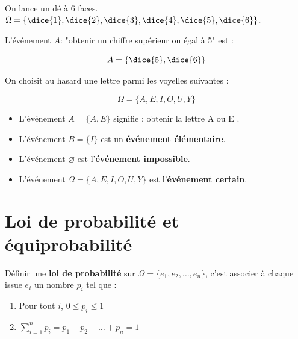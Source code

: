 On lance un dé à 6 faces. $\Omega = \{\dice{1},\dice{2},\dice{3},\dice{4},\dice{5},\dice{6}\}$.

L'événement $A$: "obtenir un chiffre supérieur ou égal à 5" est :

$$A = \{\dice{5}, \dice{6}\}$$

\ex

On choisit au hasard une lettre parmi les voyelles suivantes :

$$\Omega = \{A,E,I,O,U,Y\}$$

\begin{itemize}
	\item L'événement $A = \{A,E\}$ signifie : \og obtenir la lettre A ou E \fg.
	\item L'événement $B = \{I\}$ est un \textbf{événement élémentaire}.
	\item L'événement $\varnothing$ est l'\textbf{événement impossible}.
	\item L'événement $\Omega = \{A,E,I,O,U,Y\}$ est l'\textbf{événement certain}.
\end{itemize}

\section{Loi de probabilité et équiprobabilité}


Définir une \textbf{loi de probabilité} sur $\Omega = \{e_1, e_2, \dots, e_n\}$, c'est associer à chaque issue $e_i$ un nombre $p_i$ tel que :

\begin{enumerate}
	\item Pour tout $i$, $0 \le p_i \le 1$
	\item $\sum\limits_{i=1}^{n} p_i = p_1 + p_2 + \dots + p_n = 1$
\end{enumerate}

\ex

\def\urne{\null\\ \begin{tikzpicture}
		\draw[thick] (-2,1) arc (180:360:2 and 0.8);
		\draw[thick] (-2,1) -- (-1.6,4);
		\draw[thick] (2,1) -- (1.6,4);
		\fill[rougeClair] (0,3.2) circle (0.41);
		\node at (0,3.2) {\small\textbf{R}};
		\fill[ciel] (-0.8,2.3) circle (0.41);
		\node[text=black] at (-0.8,2.3) {\small\textbf{B}};
		\fill[ciel] (0.9,2.1) circle (0.41);
		\node[text=black] at (0.9,2.1) {\small\textbf{B}};
		\fill[menthe] (-1.0,1.1) circle (0.41);
		\node[text=black] at (-1.0,1.1) {\small\textbf{V}};
		\fill[menthe] (0,1.3) circle (0.41);
		\node[text=black] at (0,1.3) {\small\textbf{V}};
		\fill[menthe] (1.0,1.0) circle (0.41);
		\node[text=black] at (1.0,1.0) {\small\textbf{V}};
	\end{tikzpicture}
}

